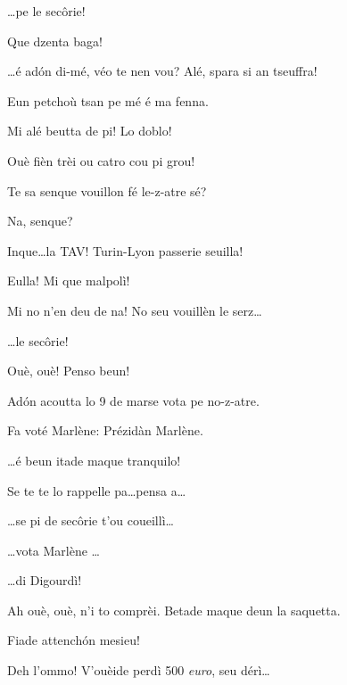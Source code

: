 \begin{drama}
\Joellespeaks \ldots pe le sec\^orie! 

\Pompiolenspeaks Que dzenta baga!

\Dallasspeaks \ldots é ad\'on di-mé, véo te nen vou? Alé, spara si an tseuffra!

\Pompiolenspeaks Eun petchoù tsan pe mé é ma fenna.

\Dallasspeaks Mi alé beutta de pi! Lo doblo!

\Joellespeaks Ouè fièn trèi ou catro cou pi grou!

\Dallasspeaks {} Te sa senque vouillon fé le-z-atre sé?

\Pompiolenspeaks Na, senque?

\Dallasspeaks Inque\ldots la TAV! Turin-Lyon passerie seuilla!

\Pompiolenspeaks {} Eulla! Mi que malpolì!

\Dallasspeaks Mi no n'en deu de na! No seu vouillèn le serz\ldots


\Dallasspeaks \ldots le sec\^orie!

\Pompiolenspeaks Ouè, ouè! Penso beun!

\Dallasspeaks Ad\'on acoutta  lo 9 de marse vota pe no-z-atre.

\Joellespeaks Fa voté Marlène: Prézidàn Marlène.

\Pompiolenspeaks \ldots é beun itade maque tranquilo!

\Dallasspeaks Se te te lo rappelle pa\ldots pensa a\ldots

\Joellespeaks \ldots se pi de sec\^orie t'ou coueillì\ldots

\Dallasspeaks \ldots vota Marlène \ldots

\Joellespeaks  \ldots di Digourdì!


\Pompiolenspeaks Ah ouè, ouè, n'i to comprèi. Betade maque deun la saquetta.


\Joellespeaks  Fiade attench\'on mesieu!

\Dallasspeaks Deh l'ommo! V'ouèide perdì 500 \textit{euro}, seu dérì\ldots


\end{drama}
